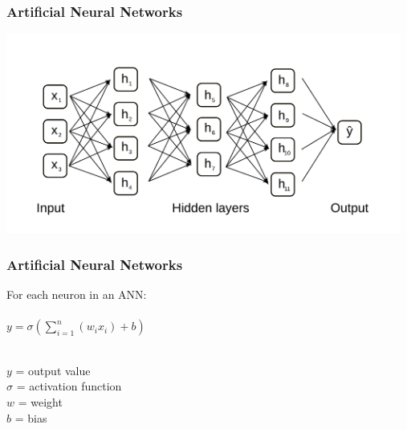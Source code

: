 \documentclass[aspectratio=169]{beamer}
\begin{document}
\begin{frame}
  \frametitle{Artificial Neural Networks}
  \begin{center}
    \includegraphics[width=13.0cm]{images/ANN_with_serveral_hidden_layers.pdf}
  \end{center}  
\end{frame}



\begin{frame}
  \frametitle{Artificial Neural Networks}
  \begin{center}
    For each neuron in an ANN:\\
    \ \\
    {
    \Large      
      $y = \sigma (\sum_{i=1}^{n} {(w_{i} x_{i}) + b})$  \\
    }
    \ \\
  \end{center}

    $y$ = output value\\
    $\sigma$ = activation function\\
    $w$ = weight\\
    $b$ = bias\\
  
\end{frame}
\end{document}
